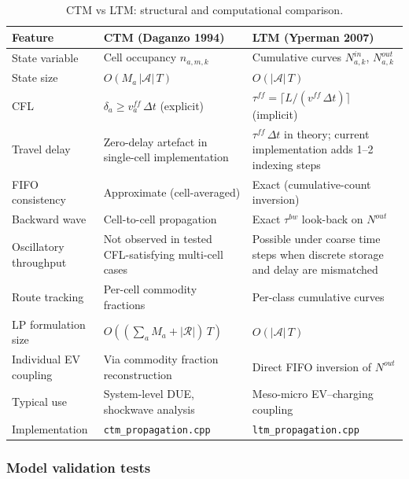 \begin{table}[htbp]
\centering
\caption{CTM vs LTM: structural and computational comparison.}
\label{tab:ctm-ltm-comparison}
\begin{tabularx}{\textwidth}{lXX}
\toprule
Feature & CTM (Daganzo 1994) & LTM (Yperman 2007) \\
\midrule
State variable &
  Cell occupancy $n_{a,m,k}$ &
  Cumulative curves $N^{in}_{a,k}$, $N^{out}_{a,k}$ \\
State size &
  $O(M_a\,|\mathcal{A}|\,T)$ &
  $O(|\mathcal{A}|\,T)$ \\
CFL &
  $\delta_a \ge v^{ff}_a\,\Delta t$ (explicit) &
  $\tau^{ff} = \lceil L/(v^{ff}\,\Delta t) \rceil$ (implicit) \\
Travel delay &
  Zero-delay artefact in single-cell implementation &
  $\tau^{ff}\,\Delta t$ in theory; current implementation adds 1--2 indexing steps \\
FIFO consistency &
  Approximate (cell-averaged) &
  Exact (cumulative-count inversion) \\
Backward wave &
  Cell-to-cell propagation &
  Exact $\tau^{bw}$ look-back on $N^{out}$ \\
Oscillatory throughput &
  Not observed in tested CFL-satisfying multi-cell cases &
  Possible under coarse time steps when discrete storage and delay are mismatched \\
Route tracking &
  Per-cell commodity fractions &
  Per-class cumulative curves \\
LP formulation size &
  $O((\sum_a M_a + |\mathcal{R}|)\,T)$ &
  $O(|\mathcal{A}|\,T)$ \\
Individual EV coupling &
  Via commodity fraction reconstruction &
  Direct FIFO inversion of $N^{out}$ \\
Typical use &
  System-level DUE, shockwave analysis &
  Meso-micro EV–charging coupling \\
Implementation &
  \texttt{ctm\_propagation.cpp} &
  \texttt{ltm\_propagation.cpp} \\
\bottomrule
\end{tabularx}
\end{table}

\subsubsection{Model validation tests}
\label{sec:traffic-nr-ev-penetration}

